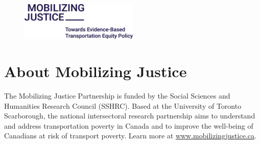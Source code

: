 \vspace{-15.5cm}
\begin{center}
\end{center}

\vspace{1cm}
\begin{figure}[b]
\includegraphics[width=0.5\textwidth]{images/mj-logo.png}
\end{figure}

\onehalfspacing

\newpage

\section*{About Mobilizing Justice}

The Mobilizing Justice Partnership is funded by the Social Sciences and Humanities Research Council (SSHRC). Based at the University of Toronto Scarborough, the national intersectoral research partnership aims to understand and address transportation poverty in Canada and to improve the well-being of Canadians at risk of transport poverty. Learn more at \url{www.mobilizingjustice.ca}.

